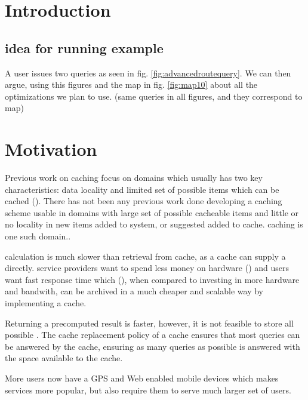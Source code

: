\section{Introduction} \label{sec:intro}

\subsection{idea for running example}
A user issues two queries as seen in fig. \ref{fig:advancedroutequery}. We can then argue, using this figures and the map in fig. \ref{fig:map10} about all the optimizations we plan to use. (same queries in all figures, and they correspond to map)




\section{Motivation}
Previous work on caching focus on domains which usually has two key characteristics: data locality and limited set of possible items which can be cached (\cite{ref.}). 
There has not been any previous work done developing a caching scheme usable in domains with large set of possible cacheable items and little or no locality in new items added to system, or suggested added to cache. \spath caching is one such domain.. 

\spath calculation is much slower than retrieval from cache, as a cache can supply a \spath directly. 
\spath service providers want to spend less money on hardware (\cite{ref.}) and users want fast response time which (\cite{ref.}), when compared to investing in more hardware and bandwith, can be archived in a much cheaper and scalable way by implementing a \spath cache.

Returning a precomputed \spath result is faster, however, it is not feasible to store all possible \spaths. The cache replacement policy of a \spath cache ensures that most queries can be answered by the cache, ensuring as many queries as possible is answered with the space available to the \spath cache.

More users now have a GPS and Web enabled mobile devices which makes \spath services more popular, but also require them to serve much larger set of users.








